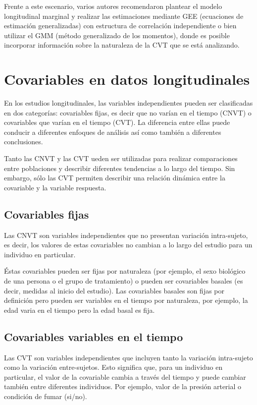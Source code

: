 \documentclass[spanish]{article}
\numberwithin{figure}{subsection}
\numberwithin{equation}{subsection}
\numberwithin{table}{subsection}
\begin{document}
Frente a este escenario, varios autores recomendaron plantear el modelo
longitudinal marginal y realizar las estimaciones mediante GEE (ecuaciones de
estimación generalizadas) con estructura de correlación independiente o bien
utilizar el GMM (método generalizado de los momentos), donde es posible
incorporar información sobre la naturaleza de la CVT que se está analizando.

\newpage

\section{Covariables en datos longitudinales}

En los estudios longitudinales, las variables independientes pueden ser
clasificadas en dos categorías: covariables fijas, es decir que no varían en el
tiempo (CNVT) o covariables que varían en el tiempo (CVT). La diferencia entre
ellas puede conducir a diferentes enfoques de análisis así como también a
diferentes conclusiones.

Tanto las CNVT y las CVT ueden ser utilizadas para realizar comparaciones entre
poblaciones y describir diferentes tendencias a lo largo del tiempo. Sin
embargo, sólo las CVT permiten describir una relación dinámica entre la
covariable y la variable respuesta.

\subsection{Covariables fijas}

Las CNVT son variables independientes que no presentan variación intra-sujeto,
es decir, los valores de estas covariables no cambian a lo largo del estudio
para un individuo en particular.

Éstas covariables pueden ser fijas por naturaleza (por ejemplo, el sexo
biológico de una persona o el grupo de tratamiento) o pueden ser covariables
basales (es decir, medidas al inicio del estudio). Las covariables basales son
fijas por definición pero pueden ser variables en el tiempo por naturaleza, por
ejemplo, la edad varia en el tiempo pero la edad basal es fija.

\subsection{Covariables variables en el tiempo}

Las CVT son variables independientes que incluyen tanto la variación
intra-sujeto como la variación entre-sujetos. Esto significa que, para un
individuo en particular, el valor de la covariable cambia a través del tiempo y
puede cambiar también entre diferentes individuos. Por ejemplo, valor de la
presión arterial o condición de fumar (si/no).
\end{document}
